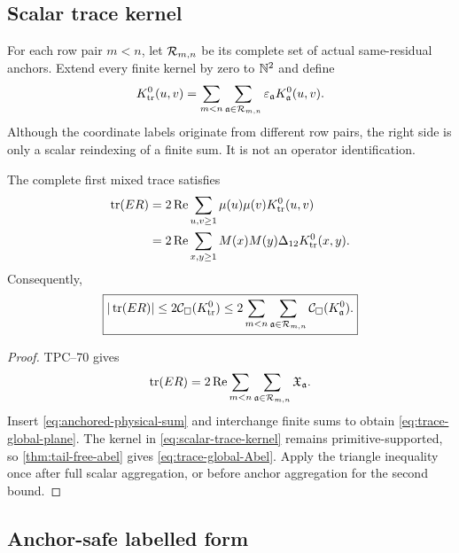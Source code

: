 \subsection{Scalar trace kernel}

For each row pair \(m<n\), let \(\mathcal R_{m,n}\) be its complete set of actual
same-residual anchors.  Extend every finite kernel by zero to \(\mathbb N^2\) and
define
\begin{equation}
 K_{\rm tr}^{0}(u,v)
 =
 \sum_{m<n}
 \sum_{\mathfrak a\in\mathcal R_{m,n}}
 \varepsilon_{\mathfrak a}K_{\mathfrak a}^{0}(u,v).
 \label{eq:scalar-trace-kernel}
\end{equation}
Although the coordinate labels originate from different row pairs, the
right side is only a scalar reindexing of a finite sum.  It is not an
operator identification.

\begin{theorem}
\label{thm:global-trace-Abelization}
The complete first mixed trace satisfies
\begin{align}
 \operatorname{tr}(ER)
 &=
 2\operatorname{Re}
 \sum_{u,v\ge1}
 \mu(u)\mu(v)K_{\rm tr}^{0}(u,v)
 \label{eq:trace-global-plane}\\
 &=
 2\operatorname{Re}
 \sum_{x,y\ge1}
 M(x)M(y)\Delta_{12}K_{\rm tr}^{0}(x,y).
 \label{eq:trace-global-Abel}
\end{align}
Consequently,
\begin{equation}
 \boxed{
 |\operatorname{tr}(ER)|
 \le
 2\mathcal C_\square(K_{\rm tr}^{0})
 \le
 2\sum_{m<n}\sum_{\mathfrak a\in\mathcal R_{m,n}}
 \mathcal C_\square(K_{\mathfrak a}^{0}).}
 \label{eq:global-trace-certificate}
\end{equation}
\end{theorem}

\begin{proof}
TPC--70 \citep{WangTPC70} gives
\[
 \operatorname{tr}(ER)
 =
 2\operatorname{Re}
 \sum_{m<n}\sum_{\mathfrak a\in\mathcal R_{m,n}}
 \mathfrak X_{\mathfrak a}.
\]
Insert \eqref{eq:anchored-physical-sum} and interchange finite sums to
obtain \eqref{eq:trace-global-plane}.  The kernel in
\eqref{eq:scalar-trace-kernel} remains primitive-supported, so
\cref{thm:tail-free-abel} gives \eqref{eq:trace-global-Abel}.  Apply the
triangle inequality once after full scalar aggregation, or before anchor
aggregation for the second bound.
\end{proof}

\subsection{Anchor-safe labelled form}

